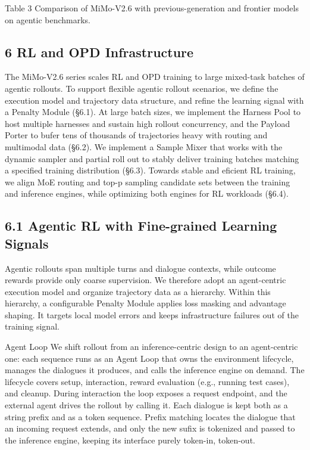 \documentclass[
  10
]{article}
\begin{document}
Table 3 Comparison of MiMo-V2.6 with previous-generation and frontier
models on agentic benchmarks.

\subsection{6 RL and OPD
Infrastructure}\label{rl-and-opd-infrastructure}

The MiMo-V2.6 series scales RL and OPD training to large mixed-task
batches of agentic rollouts. To support flexible agentic rollout
scenarios, we define the execution model and trajectory data structure,
and refine the learning signal with a Penalty Module (§6.1). At large
batch sizes, we implement the Harness Pool to host multiple harnesses
and sustain high rollout concurrency, and the Payload Porter to bufer
tens of thousands of trajectories heavy with routing and multimodal data
(§6.2). We implement a Sample Mixer that works with the dynamic sampler
and partial roll out to stably deliver training batches matching a
specified training distribution (§6.3). Towards stable and eficient RL
training, we align MoE routing and top-p sampling candidate sets between
the training and inference engines, while optimizing both engines for RL
workloads (§6.4).

\subsection{6.1 Agentic RL with Fine-grained Learning
Signals}\label{agentic-rl-with-fine-grained-learning-signals}

Agentic rollouts span multiple turns and dialogue contexts, while
outcome rewards provide only coarse supervision. We therefore adopt an
agent-centric execution model and organize trajectory data as a
hierarchy. Within this hierarchy, a configurable Penalty Module applies
loss masking and advantage shaping. It targets local model errors and
keeps infrastructure failures out of the training signal.

Agent Loop We shift rollout from an inference-centric design to an
agent-centric one: each sequence runs as an Agent Loop that owns the
environment lifecycle, manages the dialogues it produces, and calls the
inference engine on demand. The lifecycle covers setup, interaction,
reward evaluation (e.g., running test cases), and cleanup. During
interaction the loop exposes a request endpoint, and the external agent
drives the rollout by calling it. Each dialogue is kept both as a string
prefix and as a token sequence. Prefix matching locates the dialogue
that an incoming request extends, and only the new sufix is tokenized
and passed to the inference engine, keeping its interface purely
token-in, token-out.
\end{document}
